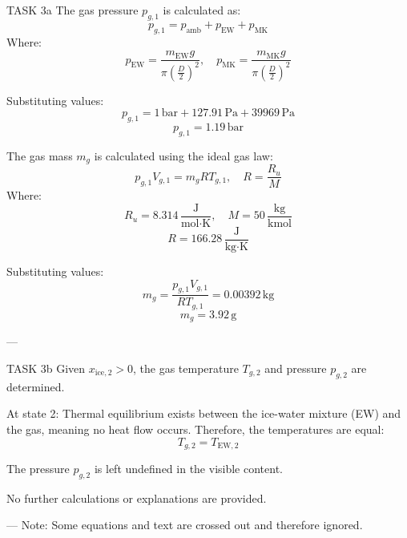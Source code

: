 TASK 3a  
The gas pressure \( p_{g,1} \) is calculated as:  
\[
p_{g,1} = p_{\text{amb}} + p_{\text{EW}} + p_{\text{MK}}
\]  
Where:  
\[
p_{\text{EW}} = \frac{m_{\text{EW}} g}{\pi \left(\frac{D}{2}\right)^2}, \quad p_{\text{MK}} = \frac{m_{\text{MK}} g}{\pi \left(\frac{D}{2}\right)^2}
\]  

Substituting values:  
\[
p_{g,1} = 1 \, \text{bar} + 127.91 \, \text{Pa} + 39969 \, \text{Pa}
\]  
\[
p_{g,1} = 1.19 \, \text{bar}
\]  

The gas mass \( m_g \) is calculated using the ideal gas law:  
\[
p_{g,1} V_{g,1} = m_g R T_{g,1}, \quad R = \frac{R_u}{M}
\]  
Where:  
\[
R_u = 8.314 \, \frac{\text{J}}{\text{mol·K}}, \quad M = 50 \, \frac{\text{kg}}{\text{kmol}}
\]  
\[
R = 166.28 \, \frac{\text{J}}{\text{kg·K}}
\]  

Substituting values:  
\[
m_g = \frac{p_{g,1} V_{g,1}}{R T_{g,1}} = 0.00392 \, \text{kg}
\]  
\[
m_g = 3.92 \, \text{g}
\]  

---

TASK 3b  
Given \( x_{\text{ice},2} > 0 \), the gas temperature \( T_{g,2} \) and pressure \( p_{g,2} \) are determined.  

At state 2:  
Thermal equilibrium exists between the ice-water mixture (EW) and the gas, meaning no heat flow occurs. Therefore, the temperatures are equal:  
\[
T_{g,2} = T_{\text{EW},2}
\]  

The pressure \( p_{g,2} \) is left undefined in the visible content.  

No further calculations or explanations are provided.  

---  
Note: Some equations and text are crossed out and therefore ignored.